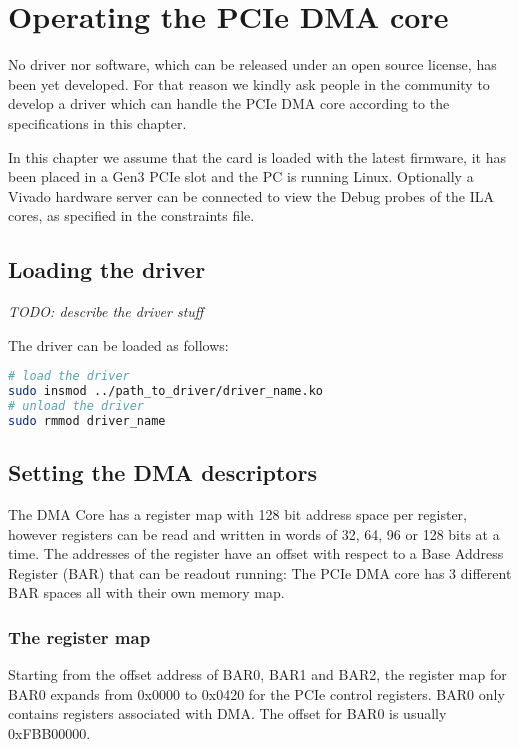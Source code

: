 \section{Operating the PCIe DMA core}
No driver nor software, which can be released under an open source license, has been yet developed. For that reason we kindly ask people in the community to develop a driver which can handle the PCIe DMA core according to the specifications in this chapter.

In this chapter we assume that the card is loaded with the latest firmware, it has been placed in a Gen3 PCIe slot and the PC is running Linux. Optionally a Vivado hardware server can be connected to view the Debug probes of the ILA cores, as specified in the constraints file. \cite{programming}\

\subsection{Loading the driver}

\emph{TODO: describe the driver stuff}

The driver can be loaded as follows:
\begin{lstlisting}[language=BASH, frame=single, caption=Loading the driver]
# load the driver
sudo insmod ../path_to_driver/driver_name.ko
# unload the driver
sudo rmmod driver_name
\end{lstlisting}


\subsection{Setting the DMA descriptors}

The DMA Core has a register map with 128 bit address space per register, however registers can be read and written in words of 32, 64, 96 or 128 bits at a time. The addresses of the register have an offset with respect to a Base Address Register (BAR) that can be readout running: The PCIe DMA core has 3 different BAR spaces all with their own memory map. 
\newpage
\subsubsection{The register map}

Starting from the offset address of BAR0, BAR1 and BAR2, the register map for BAR0 expands from 0x0000 to 0x0420 for the PCIe control registers. BAR0 only contains registers associated with DMA. The offset for BAR0 is usually 0xFBB00000.

